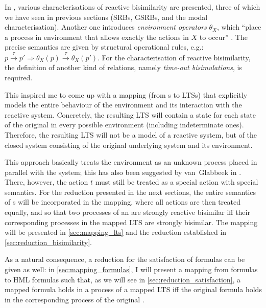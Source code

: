 %
\begin{isabellebody}%
%
%
\isadelimtheory
%
\endisadelimtheory
%
\isatagtheory
%
\endisatagtheory
{\isafoldtheory}%
%
\isadelimtheory
%
\endisadelimtheory
%
\isadelimdocument
%
\endisadelimdocument
%
\isatagdocument
%
\isamarkuptrue%
%
\endisatagdocument
{\isafolddocument}%
%
\isadelimdocument
%
\endisadelimdocument
%
\begin{isamarkuptext}%
\label{chap:reductions}%
\end{isamarkuptext}\isamarkuptrue%
%
\begin{isamarkuptext}%
In \cite{rbs}, various characterisations of reactive bisimilarity are presented, three of which we have seen in previous sections (SRBs, GSRBs, and the modal characterisation). Another one introduces \emph{environment operators} $\theta_X$, which \enquote{place a process in  environment that allows exactly the actions in $X$ to occur} \cite[section 4]{rbs}. The precise semantics are given by structural operational rules, e.g.: $p \xrightarrow{\tau} p' \Longrightarrow \theta_X(p) \xrightarrow{\tau} \theta_X(p')$. For the characterisation of reactive bisimilarity, the definition of another kind of relations, namely \emph{time-out bisimulations}, is required. 

This inspired me to come up with a mapping (from \LTSt{}s to LTSs) that explicitly models the entire behaviour of the environment and its interaction with the reactive system. Concretely, the resulting LTS will contain a state for each state of the original \LTSt{} in every possible environment (including indeterminate ones). Therefore, the resulting LTS will not be a model of a reactive system, but of the closed system consisting of the original underlying system and its environment.

This approach basically treats the environment as an unknown process placed in parallel with the system; this has also been suggested by van~Glabbeek in \cite[section 2]{rbs}. There, however, the action $t$ must still be treated as a special action with special semantics. For the reduction presented in the next sections, the entire semantics of \LTSt{}s will be incorporated in the mapping, where all actions are then treated equally, and so that two processes of an \LTSt{} are strongly reactive bisimilar iff their corresponding processes in the mapped LTS are strongly bisimilar. The mapping will be presented in \cref{sec:mapping_lts} and the reduction established in \cref{sec:reduction_bisimilarity}.

As a natural consequence, a reduction for the satisfaction of \HMLt{} formulas can be given as well:
in \cref{sec:mapping_formulas}, I will present a mapping from \HMLt{} formulas to HML formulas such that, as we will see in \cref{sec:reduction_satisfaction}, a mapped formula holds in a process of a mapped LTS iff the original formula holds in the corresponding process of the original \LTSt{}.%
\end{isamarkuptext}\isamarkuptrue%
%
\isadelimtheory
%
\endisadelimtheory
%
\isatagtheory
%
\endisatagtheory
{\isafoldtheory}%
%
\isadelimtheory
%
\endisadelimtheory
%
\end{isabellebody}%
\endinput
